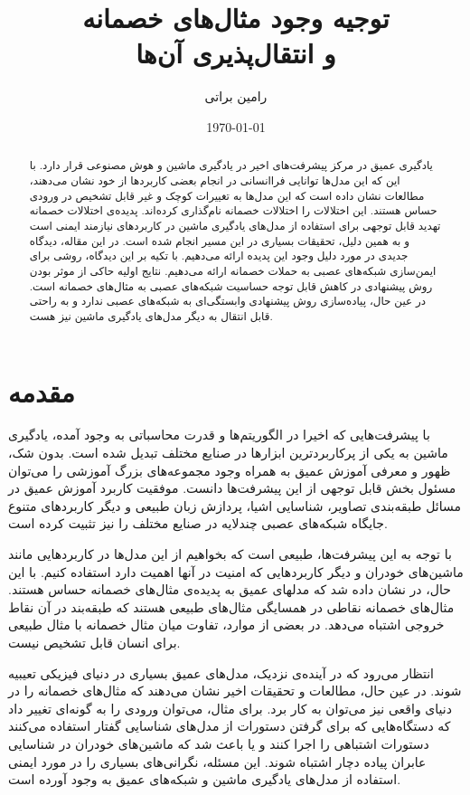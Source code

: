 \documentclass[12pt,onecolumn,a4paper]{article}
\begin{document}
\title{توجیه وجود مثال‌های خصمانه \\ و انتقال‌پذیری آن‌ها} 
\author{رامین براتی}
\date{\today}
\maketitle

\begin{abstract}
یادگیری عمیق در مرکز پیشرفت‌های اخیر در یادگیری ماشین و هوش مصنوعی قرار دارد. با این که این مدل‌ها توانایی فراانسانی در انجام بعضی کاربردها از خود نشان می‌دهند، مطالعات نشان داده است که این مدل‌ها به تغییرات کوچک و غیر قابل تشخیص در ورودی حساس هستند. این اختلالات را اختلالات خصمانه نام‌گذاری کرده‌اند. پدیده‌ی اختلالات خصمانه تهدید قابل توجهی برای استفاده از مدل‌های یادگیری ماشین در کاربردهای نیازمند ایمنی است و به همین دلیل، تحقیقات بسیاری در این مسیر انجام شده است. در این مقاله، دیدگاه جدیدی در مورد دلیل وجود این پدیده ارائه می‌دهیم. با تکیه بر این دیدگاه، روشی برای ایمن‌سازی شبکه‌های عصبی به حملات خصمانه ارائه می‌دهیم. نتایج اولیه حاکی از موثر بودن روش پیشنهادی در کاهش قابل توجه حساسیت شبکه‌های عصبی به مثال‌های خصمانه است. در عین حال، پیاده‌سازی روش پیشنهادی وابستگی‌ای به شبکه‌های عصبی ندارد و به راحتی قابل انتقال به دیگر مدل‌های یادگیری ماشین نیز هست.
\end{abstract}

\section{مقدمه} 
با پیشرفت‌هایی که اخیرا در الگوریتم‌ها و قدرت محاسباتی به وجود آمده، یادگیری ماشین به یکی از پرکاربردترین ابزارها در صنایع مختلف تبدیل شده است. بدون شک، ظهور و معرفی آموزش عمیق به همراه وجود مجموعه‌های بزرگ آموزشی را می‌توان مسئول بخش قابل توجهی از این پیشرفت‌ها دانست. موفقیت‌ کاربرد آموزش عمیق در مسائل طبقه‌بندی تصاویر، شناسایی اشیا، پردازش زبان طبیعی و دیگر کاربردهای متنوع جایگاه شبکه‌های عصبی چندلایه در صنایع مختلف را نیز تثبیت کرده است.

با توجه به این پیشرفت‌ها، طبیعی است که بخواهیم از این مدل‌ها در کاربردهایی مانند ماشین‌های خودران و دیگر کاربردهایی که امنیت در آنها اهمیت دارد استفاده کنیم. با این حال، در
\cite{szegedy2013intriguing} 
نشان داده شد که مدلهای عمیق به پدیده‌ی مثال‌های خصمانه حساس هستند. مثال‌های خصمانه نقاطی در همسایگی مثال‌های طبیعی هستند که طبقه‌بند در آن نقاط خروجی اشتباه می‌دهد. در بعضی از موارد، تفاوت میان مثال خصمانه با مثال طبیعی برای انسان قابل تشخیص نیست.

انتظار می‌رود که در آینده‌ی نزدیک، مدل‌های عمیق بسیاری در دنیای فیزیکی تعیبیه شوند. در عین حال، مطالعات و تحقیقات اخیر نشان می‌دهند که مثال‌های خصمانه را در دنیای واقعی نیز می‌توان به کار برد. برای مثال، می‌توان ورودی را به گونه‌ای تغییر داد که دستگاه‌هایی که برای گرفتن دستورات از مدل‌های شناسایی گفتار استفاده می‌کنند دستورات اشتباهی را اجرا کنند و یا باعث شد که ماشین‌های خودران در شناسایی عابران پیاده دچار اشتباه شوند. این مسئله، نگرانی‌های بسیاری را در مورد ایمنی استفاده از مدل‌های یادگیری ماشین و شبکه‌های عمیق به وجود آورده است.
\end{document}
